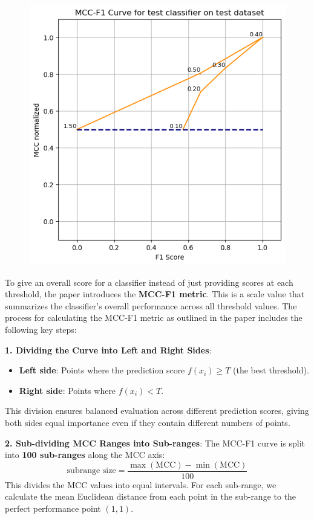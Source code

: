 \documentclass[12pt, oneside]{amsart}
\theoremstyle{definition}
\theoremstyle{remark}
\numberwithin{equation}{section}
\begin{document}
\begin{figure}[hbt!]
    \caption{}
    \centering
    \includegraphics[scale=0.4]{Report/Figure/figure1.jpg}
    \label{figure1}
\end{figure}
\FloatBarrier


To give an overall score for a classifier instead of just providing scores at each threshold, the paper introduces the \textbf{MCC-F1 metric}. This is a scale value that summarizes the classifier's overall performance across all threshold values. The process for calculating the MCC-F1 metric as outlined in the paper includes the following key steps:

\textbf{1. Dividing the Curve into Left and Right Sides}:
   \begin{itemize}
      \item \textbf{Left side}: Points where the prediction score \( f(x_i) \geq T \) (the best threshold).
      \item \textbf{Right side}: Points where \( f(x_i) < T \).
   \end{itemize}
   This division ensures balanced evaluation across different prediction scores, giving both sides equal importance even if they contain different numbers of points.

\textbf{2. Sub-dividing MCC Ranges into Sub-ranges}:
   The MCC-F1 curve is split into \textbf{100 sub-ranges} along the MCC axis:
   \[
   \text{subrange size} = \frac{\max(\text{MCC}) - \min(\text{MCC})}{100}
   \]
   This divides the MCC values into equal intervals. For each sub-range, we calculate the mean Euclidean distance from each point in the sub-range to the perfect performance point \((1, 1)\).
\end{document}
